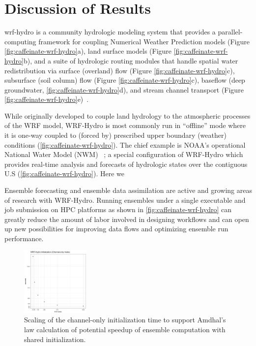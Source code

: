 \section{Discussion of Results}\label{sec:discussion}
\gls{wrf-hydro} is a community hydrologic modeling system that provides a parallel-computing
framework for coupling Numerical Weather Prediction models (Figure \ref{fig:caffeinate-wrf-hydro}a), land surface models
(Figure \ref{fig:caffeinate-wrf-hydro}b), and a suite of hydrologic routing modules that handle spatial water redistribution
via surface (overland) flow (Figure \ref{fig:caffeinate-wrf-hydro}c), subsurface (soil column) flow (Figure \ref{fig:caffeinate-wrf-hydro}c),
baseflow (deep groundwater, \ref{fig:caffeinate-wrf-hydro}d), and stream channel transport
(Figure \ref{fig:caffeinate-wrf-hydro}e)~\cite{gochisEtal2014}.

While originally developed to couple land hydrology to the atmospheric processes of
the WRF model, WRF-Hydro is most commonly run in ``offline'' mode where it is one-way
coupled to (forced by) prescribed upper boundary (weather)
conditions (\ref{fig:caffeinate-wrf-hydro}). The chief example is NOAA's operational
National Water Model (NWM) ~\cite{noaa2016}; a special configuration of
WRF-Hydro which provides real-time analysis and forecasts of
hydrologic states over the contiguous U.S (\ref{fig:caffeinate-wrf-hydro}). Here we

Ensemble forecasting and ensemble data assimilation are active and
growing areas of research with WRF-Hydro. Running ensembles under a
single executable and job submission on HPC platforms as shown in
\ref{fig:caffeinate-wrf-hydro} can greatly reduce the amount
of labor involved in designing workflows and can open up new
possibilities for improving data flows and optimizing ensemble run
performance.

\begin{figure}
\includegraphics[width=0.3\textwidth]{figures/init_timing_linear.png}
\vspace{-7pt}
\caption{Scaling of the channel-only initialization time to
  support Amdhal's law calculation of potential speedup of ensemble
  computation with shared initialization. \label{fig:wrf-hydro-init-scaling}}
\end{figure}


